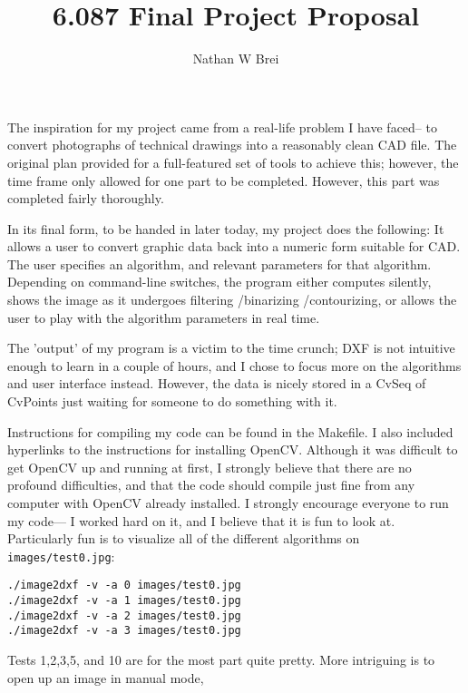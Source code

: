 \documentclass[9pt]{article}
\begin{document}
\author{Nathan W Brei}
\title{6.087 Final Project Proposal}
\date{}

\maketitle

The inspiration for my project came from a real-life problem I have faced-- to
convert photographs of technical drawings into a reasonably clean CAD
file. The original plan provided for a full-featured set of tools to achieve this; however, the time frame only allowed for one part to be completed. However, this part was completed fairly thoroughly. 

In its final form, to be handed in later today, my project does the following: It allows a user to convert graphic data back into a numeric form suitable for CAD. The user specifies an algorithm,  and relevant parameters for that algorithm. Depending on command-line switches, the program either computes silently, shows the image as it undergoes filtering /binarizing /contourizing, or allows the user to play with the algorithm parameters in real time. 

The 'output' of my program is a victim to the time crunch; DXF is not intuitive enough to learn in a couple of hours, and I chose to focus more on the algorithms and user interface instead. However, the data is nicely stored in a CvSeq of CvPoints just waiting for someone to do something with it.


Instructions for compiling my code can be found in the Makefile. I also included hyperlinks to the instructions for installing OpenCV. Although it was difficult to get OpenCV up and running at first, I strongly believe that there are no profound difficulties, and that the code should compile just fine from any computer with OpenCV already installed. I strongly encourage everyone to run my code--- I worked hard on it, and I believe that it is fun to look at. Particularly fun is to visualize all of the different algorithms on \texttt{images/test0.jpg}:

\begin{verbatim}
./image2dxf -v -a 0 images/test0.jpg
./image2dxf -v -a 1 images/test0.jpg
./image2dxf -v -a 2 images/test0.jpg
./image2dxf -v -a 3 images/test0.jpg
\end{verbatim}

Tests 1,2,3,5, and 10 are for the most part quite pretty. More intriguing is to open up an image in manual mode, 
\end{document}
